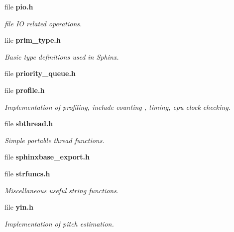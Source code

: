 \begin{DoxyCompactItemize}
file {\bf pio.\+h}
\begin{DoxyCompactList}\small\item\em file I\+O related operations. \end{DoxyCompactList}\item 
file {\bf prim\+\_\+type.\+h}
\begin{DoxyCompactList}\small\item\em Basic type definitions used in Sphinx. \end{DoxyCompactList}\item 
file {\bfseries priority\+\_\+queue.\+h}
\item 
file {\bf profile.\+h}
\begin{DoxyCompactList}\small\item\em Implementation of profiling, include counting , timing, cpu clock checking. \end{DoxyCompactList}\item 
file {\bf sbthread.\+h}
\begin{DoxyCompactList}\small\item\em Simple portable thread functions. \end{DoxyCompactList}\item 
file {\bfseries sphinxbase\+\_\+export.\+h}
\item 
file {\bf strfuncs.\+h}
\begin{DoxyCompactList}\small\item\em Miscellaneous useful string functions. \end{DoxyCompactList}\item 
file {\bf yin.\+h}
\begin{DoxyCompactList}\small\item\em Implementation of pitch estimation. \end{DoxyCompactList}\end{DoxyCompactItemize}
